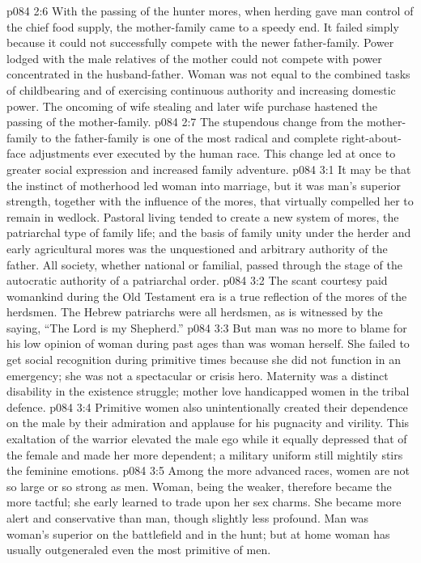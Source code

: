 \vs p084 2:6 With the passing of the hunter mores, when herding gave man control of the chief food supply, the mother\hyp{}family came to a speedy end. It failed simply because it could not successfully compete with the newer father\hyp{}family. Power lodged with the male relatives of the mother could not compete with power concentrated in the husband\hyp{}father. Woman was not equal to the combined tasks of childbearing and of exercising continuous authority and increasing domestic power. The oncoming of wife stealing and later wife purchase hastened the passing of the mother\hyp{}family.
\vs p084 2:7 The stupendous change from the mother\hyp{}family to the father\hyp{}family is one of the most radical and complete right\hyp{}about\hyp{}face adjustments ever executed by the human race. This change led at once to greater social expression and increased family adventure.
\vs p084 3:1 It may be that the instinct of motherhood led woman into marriage, but it was man’s superior strength, together with the influence of the mores, that virtually compelled her to remain in wedlock. Pastoral living tended to create a new system of mores, the patriarchal type of family life; and the basis of family unity under the herder and early agricultural mores was the unquestioned and arbitrary authority of the father. All society, whether national or familial, passed through the stage of the autocratic authority of a patriarchal order.
\vs p084 3:2 The scant courtesy paid womankind during the Old Testament era is a true reflection of the mores of the herdsmen. The Hebrew patriarchs were all herdsmen, as is witnessed by the saying, “The Lord is my Shepherd.”
\vs p084 3:3 But man was no more to blame for his low opinion of woman during past ages than was woman herself. She failed to get social recognition during primitive times because she did not function in an emergency; she was not a spectacular or crisis hero. Maternity was a distinct disability in the existence struggle; mother love handicapped women in the tribal defence.
\vs p084 3:4 Primitive women also unintentionally created their dependence on the male by their admiration and applause for his pugnacity and virility. This exaltation of the warrior elevated the male ego while it equally depressed that of the female and made her more dependent; a military uniform still mightily stirs the feminine emotions.
\vs p084 3:5 Among the more advanced races, women are not so large or so strong as men. Woman, being the weaker, therefore became the more tactful; she early learned to trade upon her sex charms. She became more alert and conservative than man, though slightly less profound. Man was woman’s superior on the battlefield and in the hunt; but at home woman has usually outgeneraled even the most primitive of men.
